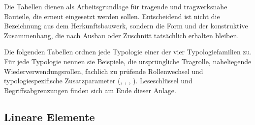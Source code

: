 \label{anlage:typologie}


Die Tabellen dienen als Arbeitsgrundlage für tragende und tragwerksnahe Bauteile, die erneut eingesetzt werden sollen. Entscheidend ist nicht die Bezeichnung aus dem Herkunftsbauwerk, sondern die Form und der konstruktive Zusammenhang, die nach Ausbau oder Zuschnitt tatsächlich erhalten bleiben.

Die folgenden Tabellen ordnen jede Typologie einer der vier Typologiefamilien zu. Für jede Typologie nennen sie Beispiele, die ursprüngliche Tragrolle, naheliegende Wiederverwendungsrollen, fachlich zu prüfende Rollenwechsel und typologiespezifische Zusatzparameter (, , , ). Leseschlüssel und Begriffsabgrenzungen finden sich am Ende dieser Anlage.



\subsection{Lineare Elemente}

